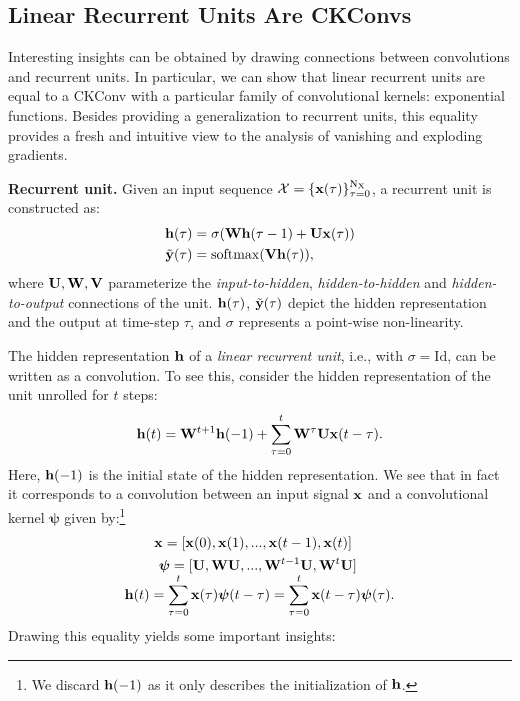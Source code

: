 \documentclass{article}
\def\gX{{\mathcal{X}}}
\newcommand{\mat}[1]{\ensuremath{{\mathbf{\MakeUppercase{{#1}}}}}}
\renewcommand{\vec}[1]{\ensuremath{\mathbf{\MakeLowercase{{#1}}}}}
\newcommand{\Wm}{\mat{W}}
\newcommand{\Vm}{\mat{V}}
\newcommand{\Um}{\mat{U}}
\newcommand{\xv}{\vec{x}}
\newcommand{\yv}{\vec{y}}
\newcommand{\hv}{\vec{h}}
\def\Nt{\mathrm{N}}
\def\Xt{\mathrm{X}}
\def\gX{{\mathcal{X}}}
\begin{document}
\subsection{Linear Recurrent Units Are CKConvs}\label{appx:linrecunitsasckconvs}
\vspace{-1mm}
Interesting insights can be obtained by drawing connections between convolutions and recurrent units. In particular, we can show that linear recurrent units are equal to a CKConv with a particular family of convolutional kernels: exponential functions. Besides providing a generalization to recurrent units, this equality provides a fresh and intuitive view to the analysis of vanishing and exploding gradients.

\textbf{Recurrent unit.} Given an input sequence $\gX = \{ \xv(\tau) \}_{\tau = 0}^{\Nt_{\Xt}}$, a recurrent unit is constructed as:
\begin{align}
 \hv(\tau) &= \sigma (\Wm \hv(\tau - 1) + \Um \xv(\tau))\label{eq:hidden_repr_formulation}\\[0 \jot]
 \tilde{\yv}(\tau) &= \mathrm{softmax}( \Vm \hv (\tau) ),
\end{align}
where $\Um, \Wm, \Vm$ parameterize the \textit{input-to-hidden}, \textit{hidden-to-hidden} and \textit{hidden-to-output} connections of the unit. $\hv(\tau)$,  $\tilde{\yv}(\tau)$ depict the hidden representation and the output at time-step $\tau$, and $\sigma$ represents a point-wise non-linearity. 

The hidden representation $\hv$ of a \textit{linear recurrent unit}, i.e., with $\sigma{=}\mathrm{Id}$, can be written as a convolution. To see this, consider the hidden representation of the unit unrolled for $t$ steps:
\begin{equation}
\setlength{\abovedisplayskip}{0pt}
\setlength{\belowdisplayskip}{1pt}
    \hv(t) = \Wm^{t+1} \hv(-1) + \sum_{\tau = 0}^{t} \Wm^{\tau}\Um \xv(t - \tau).\label{eq:unroll_t_steps}
\end{equation}
Here, $\hv(-1)$ is the initial state of the hidden representation. We see that in fact it corresponds to a convolution between an input signal $\xv$ and a convolutional kernel $\boldsymbol{\psi}$ given by:\footnote{We discard $\hv(-1)$ as it only describes the initialization of $\hv$.}
\vspace{0.0mm}
\begin{align}
     &\ \xv = [\xv(0) , \xv(1) , ... , \xv(t - 1), \xv(t) ] \label{eq:correspondence1} \\[0 \jot]
      &\ \ \boldsymbol{\psi} =  [ \Um  , \Wm \Um,  ... ,  \Wm^{t - 1} \Um, \Wm^{t} \Um] \label{eq:correspondence2}\\[-1.5\jot]
       \hv(t)& =  \sum_{\tau=0}^{t}\xv(\tau) \boldsymbol{\psi}(t-\tau)  = \sum_{\tau=0}^{t}\xv(t - \tau) \boldsymbol{\psi}(\tau) . \label{eq:correspondence3}      
\end{align}
Drawing this equality yields some important insights:
\end{document}
